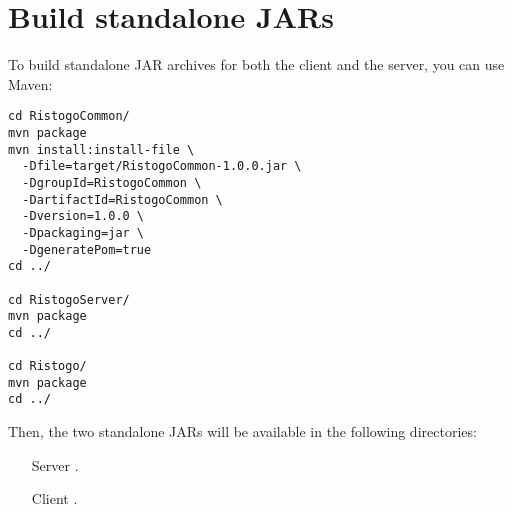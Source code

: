 \section{Build standalone JARs}

To build standalone JAR archives for both the client and the server, you can use
Maven:

\begin{verbatim}
cd RistogoCommon/
mvn package
mvn install:install-file \
  -Dfile=target/RistogoCommon-1.0.0.jar \
  -DgroupId=RistogoCommon \
  -DartifactId=RistogoCommon \
  -Dversion=1.0.0 \
  -Dpackaging=jar \
  -DgeneratePom=true
cd ../

cd RistogoServer/
mvn package
cd ../

cd Ristogo/
mvn package
cd ../
\end{verbatim}

Then, the two standalone JARs will be available in the following directories:

\begin{itemize}
	\item[Server] .
	\item[Client] .
\end{itemize}
